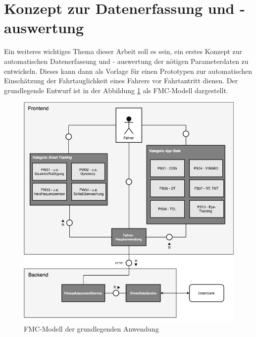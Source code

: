 \section{Konzept zur Datenerfassung und - auswertung}
\label{concept}
Ein weiteres wichtiges Thema dieser Arbeit soll es sein, ein erstes Konzept zur automatischen Datenerfassung und - auswertung der nötigen Parameterdaten zu entwickeln. Dieses kann dann als Vorlage für einen Prototypen zur automatischen Einschätzung der Fahrtauglichkeit eines Fahrers vor Fahrtantritt dienen. Der grundlegende Entwurf ist in der Abbildung \ref{fig:conceptfmc} als FMC-Modell dargestellt.

\begin{figure}
	\centering
	\includegraphics[width=\linewidth]{images/ConceptDriverAssessmentData}
	\caption[Caption for concept]{FMC-Modell der grundlegenden Anwendung}
	\label{fig:conceptfmc}
\end{figure}
